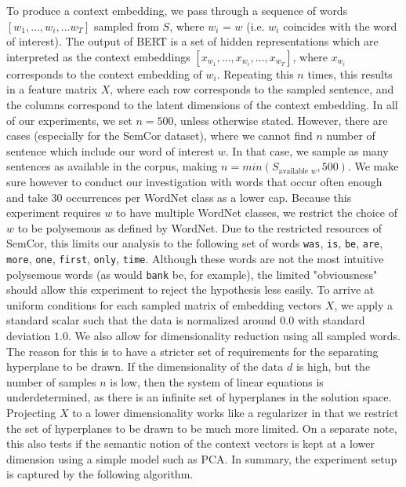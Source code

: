 \documentclass[a4paper,12pt,twoside,openright]{report}
\begin{document}
To produce a context embedding, we pass through a sequence of words $[w_1, \ldots, w_i, \ldots w_T]$ sampled from $S$, where $w_i$ = $w$ (i.e. $w_i$ coincides with the word of interest).
The output of BERT is a set of hidden representations which are interpreted as the context embeddings $[x_{w_1}, \ldots, x_{w_i}, \ldots, x_{w_T}]$, where $x_{w_i}$ corresponds to the context embedding of $w_i$.
Repeating this $n$ times, this results in a feature matrix $X$, where each row corresponds to the sampled sentence, and the columns correspond to the latent dimensions of the context embedding.
In all of our experiments, we set $n=500$, unless otherwise stated.
However, there are cases (especially for the SemCor dataset), where we cannot find $n$ number of sentence which include our word of interest $w$. 
In that case, we sample as many sentences as available in the corpus, making $n=min( S_{\text{available }w}, 500)$.
We make sure however to conduct our investigation with words that occur often enough and take 30 occurrences per WordNet class as a lower cap.
Because this experiment requires $w$ to have multiple WordNet classes, we restrict the choice of $w$ to be polysemous as defined by WordNet.
Due to the restricted resources of SemCor, this limits our analysis to the following set of words \texttt{was}, \texttt{is}, \texttt{be}, \texttt{are}, \texttt{more}, \texttt{one}, \texttt{first}, \texttt{only}, \texttt{time}.
Although these words are not the most intuitive polysemous words (as would \Verb#bank# be, for example), the limited "obviousness" should allow this experiment to reject the hypothesis less easily.
To arrive at uniform conditions for each sampled matrix of embedding vectors $X$, we apply a standard scalar such that the data is normalized around $0.0$ with standard deviation $1.0$.
We also allow for dimensionality reduction using all sampled words.
The reason for this is to have a stricter set of requirements for the separating hyperplane to be drawn.
If the dimensionality of the data $d$ is high, but the number of samples $n$ is low, then the system of linear equations is underdetermined, as there is an infinite set of hyperplanes in the solution space.
Projecting $X$ to a lower dimensionality works like a regularizer in that we restrict the set of hyperplanes to be drawn to be much more limited.
On a separate note, this also tests if the semantic notion of the context vectors is kept at a lower dimension using a simple model such as PCA.
In summary, the experiment setup is captured by the following algorithm. \\
\end{document}
